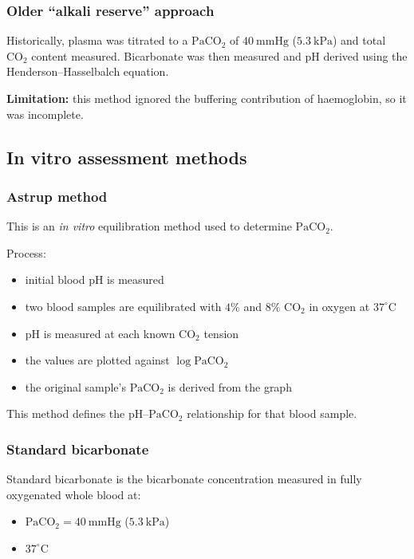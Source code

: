 \documentclass[11pt,a4paper]{article}
\begin{document}
\subsubsection{Older ``alkali reserve'' approach}
Historically, plasma was titrated to a \(\mathrm{PaCO_2}\) of \(40~\mathrm{mmHg}\) (\(5.3~\mathrm{kPa}\)) and total \(\mathrm{CO_2}\) content measured. Bicarbonate was then measured and pH derived using the Henderson--Hasselbalch equation.

\textbf{Limitation:} this method ignored the buffering contribution of haemoglobin, so it was incomplete.

\subsection{In vitro assessment methods}

\subsubsection{Astrup method}
This is an \emph{in vitro} equilibration method used to determine \(\mathrm{PaCO_2}\).

Process:
\begin{itemize}
  \item initial blood pH is measured
  \item two blood samples are equilibrated with \(4\%\) and \(8\%\) \(\mathrm{CO_2}\) in oxygen at \(37^\circ\mathrm{C}\)
  \item pH is measured at each known \(\mathrm{CO_2}\) tension
  \item the values are plotted against \(\log \mathrm{PaCO_2}\)
  \item the original sample's \(\mathrm{PaCO_2}\) is derived from the graph
\end{itemize}

This method defines the pH--\(\mathrm{PaCO_2}\) relationship for that blood sample.

\subsubsection{Standard bicarbonate}
Standard bicarbonate is the bicarbonate concentration measured in fully oxygenated whole blood at:
\begin{itemize}
  \item \(\mathrm{PaCO_2} = 40~\mathrm{mmHg}\) (\(5.3~\mathrm{kPa}\))
  \item \(37^\circ\mathrm{C}\)
\end{itemize}
\end{document}
